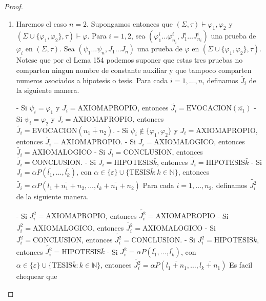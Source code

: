   \begin{proof}
    \begin{enumerate}
      \item Haremos el caso $n=2.$ Supongamos entonces que $(\Sigma, \tau)\vdash \varphi_{1},\varphi_{2}$ y $(\Sigma \cup \{\varphi_{1},\varphi_{2}\},\tau )\vdash \varphi $. Para $i=1,2$, sea $(\varphi_{1}^{i}\dotsc\varphi_{n_{i}}^{i},J_{1}^{i}\dotsc J_{n_{i}}^{i})$ una prueba de $ \varphi_{i}$ en $(\Sigma, \tau)$. Sea $(\psi_{1}\dotsc\psi_{n},J_{1}\dotsc J_{n})$ una prueba de $\varphi$ en $(\Sigma \cup \{\varphi_{1},\varphi_{2}\},\tau )$. Notese que por el Lema 154 podemos suponer que estas tres pruebas no comparten ningun nombre de constante auxiliar y que tampoco comparten numeros asociados a hipotesis o tesis. Para cada $i=1, \dotsc, n$, definamos $\widetilde{J_{i}}$ de la siguiente manera.

      - Si $\psi_{i}=\varphi_{1}$ y $J_{i}=\mathrm{AXIOMAPROPIO}$, entonces $\widetilde{J_{i}}=\mathrm{EVOCACION}(\overline{n_{1}})$
      - Si $\psi_{i}=\varphi_{2}$ y $J_{i}=\mathrm{AXIOMAPROPIO}$, entonces $\widetilde{J_{i}}=\mathrm{EVOCACION}(\overline{n_{1}+n_{2}})$.
      - Si $\psi_{i}\notin \{\varphi_{1},\varphi_{2}\}$ y $J_{i}=\mathrm{ AXIOMAPROPIO}$, entonces $\widetilde{J_{i}}=\mathrm{AXIOMAPROPIO}$.
      - Si $J_{i}=\mathrm{AXIOMALOGICO}$, entonces $\widetilde{J_{i}}= \mathrm{AXIOMALOGICO}$
      - Si $J_{i}=\mathrm{CONCLUSION}$, entonces $\widetilde{J_{i}}=\mathrm{ CONCLUSION}$.
      - Si $J_{i}=\mathrm{HIPOTESIS}\bar{k}$, entonces $\widetilde{J_{i}}= \mathrm{HIPOTESIS}\bar{k}$
      - Si $J_{i}=\alpha P(\overline{l_{1}}, \dotsc, \overline{l_{k}})$, con $ \alpha \in \{\varepsilon \}\cup \{\mathrm{TESIS}\bar{k}:k\in \mathbb{N}\}$, entonces $\widetilde{J_{i}}=\alpha P(\overline{l_{1}+n_{1}+n_{2}}, \dotsc,  \overline{l_{k}+n_{1}+n_{2}})$
      Para cada $i=1, \dotsc, n_{2}$, definamos $\widetilde{J_{i}^{2}}$ de la siguiente manera.

      - Si $J_{i}^{2}=\mathrm{AXIOMAPROPIO}$, entonces $\widetilde{J_{i}^{2} }=\mathrm{AXIOMAPROPIO}$
      - Si $J_{i}^{2}=\mathrm{AXIOMALOGICO}$, entonces $\widetilde{J_{i}^{2} }=\mathrm{AXIOMALOGICO}$
      - Si $J_{i}^{2}=\mathrm{CONCLUSION}$, entonces $\widetilde{J_{i}^{2}}= \mathrm{CONCLUSION}$.
      - Si $J_{i}^{2}=\mathrm{HIPOTESIS}\bar{k}$, entonces $\widetilde{ J_{i}^{2}}=\mathrm{HIPOTESIS}\bar{k}$
      - Si $J_{i}^{2}=\alpha P(\overline{l_{1}}, \dotsc, \overline{l_{k}})$, con $\alpha \in \{\varepsilon \}\cup \{\mathrm{TESIS}\bar{k}:k\in \mathbb{N}\}$, entonces $\widetilde{J_{i}^{2}}=\alpha P(\overline{l_{1}+n_{1}}, \dotsc,  \overline{l_{k}+n_{1}})$
      Es facil chequear que


\end{enumerate}
\end{proof}
